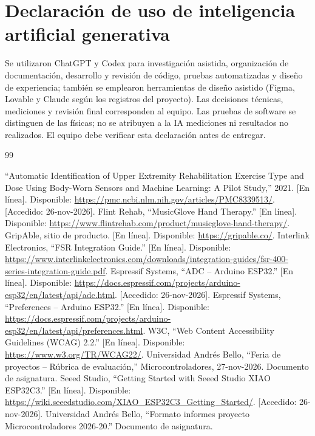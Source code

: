 \documentclass[11pt,letterpaper]{article}
\begin{document}
\section*{Declaración de uso de inteligencia artificial generativa}
Se utilizaron ChatGPT y Codex para investigación asistida, organización de documentación, desarrollo y revisión de código, pruebas automatizadas y diseño de experiencia; también se emplearon herramientas de diseño asistido (Figma, Lovable y Claude según los registros del proyecto). Las decisiones técnicas, mediciones y revisión final corresponden al equipo. Las pruebas de software se distinguen de las físicas; no se atribuyen a la IA mediciones ni resultados no realizados. El equipo debe verificar esta declaración antes de entregar.
\clearpage
\begin{thebibliography}{99}
 ``Automatic Identification of Upper Extremity Rehabilitation Exercise Type and Dose Using Body-Worn Sensors and Machine Learning: A Pilot Study,'' 2021. [En línea]. Disponible: \url{https://pmc.ncbi.nlm.nih.gov/articles/PMC8339513/}. [Accedido: 26-nov-2026].
 Flint Rehab, ``MusicGlove Hand Therapy.'' [En línea]. Disponible: \url{https://www.flintrehab.com/product/musicglove-hand-therapy/}.
 GripAble, sitio de producto. [En línea]. Disponible: \url{https://gripable.co/}.
 Interlink Electronics, ``FSR Integration Guide.'' [En línea]. Disponible: \url{https://www.interlinkelectronics.com/downloads/integration-guides/fsr-400-series-integration-guide.pdf}.
 Espressif Systems, ``ADC -- Arduino ESP32.'' [En línea]. Disponible: \url{https://docs.espressif.com/projects/arduino-esp32/en/latest/api/adc.html}. [Accedido: 26-nov-2026].
 Espressif Systems, ``Preferences -- Arduino ESP32.'' [En línea]. Disponible: \url{https://docs.espressif.com/projects/arduino-esp32/en/latest/api/preferences.html}.
 W3C, ``Web Content Accessibility Guidelines (WCAG) 2.2.'' [En línea]. Disponible: \url{https://www.w3.org/TR/WCAG22/}.
 Universidad Andrés Bello, ``Feria de proyectos -- Rúbrica de evaluación,'' Microcontroladores, 27-nov-2026. Documento de asignatura.
 Seeed Studio, ``Getting Started with Seeed Studio XIAO ESP32C3.'' [En línea]. Disponible: \url{https://wiki.seeedstudio.com/XIAO_ESP32C3_Getting_Started/}. [Accedido: 26-nov-2026].
 Universidad Andrés Bello, ``Formato informes proyecto Microcontroladores 2026-20.'' Documento de asignatura.
\end{thebibliography}
\clearpage
\end{document}

